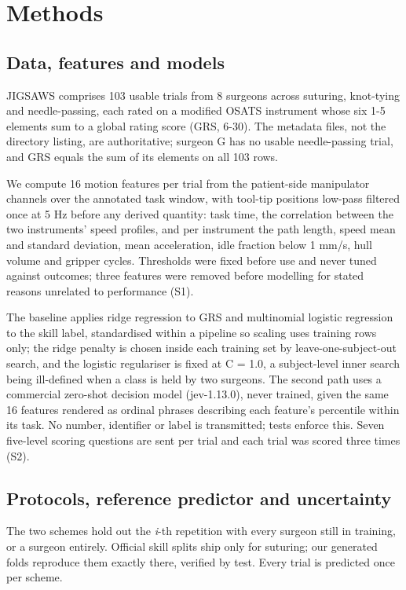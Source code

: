 \section{Methods}

\subsection{Data, features and models}

JIGSAWS comprises 103 usable trials from 8 surgeons across suturing, knot-tying and needle-passing, each rated on a modified OSATS instrument whose six 1-5 elements sum to a global rating score (GRS, 6-30). The metadata files, not the directory listing, are authoritative; surgeon G has no usable needle-passing trial, and GRS equals the sum of its elements on all 103 rows.

We compute 16 motion features per trial from the patient-side manipulator channels over the annotated task window, with tool-tip positions low-pass filtered once at 5 Hz before any derived quantity: task time, the correlation between the two instruments' speed profiles, and per instrument the path length, speed mean and standard deviation, mean acceleration, idle fraction below 1 mm/s, hull volume and gripper cycles. Thresholds were fixed before use and never tuned against outcomes; three features were removed before modelling for stated reasons unrelated to performance (S1).

The baseline applies ridge regression to GRS and multinomial logistic regression to the skill label, standardised within a pipeline so scaling uses training rows only; the ridge penalty is chosen inside each training set by leave-one-subject-out search, and the logistic regulariser is fixed at C = 1.0, a subject-level inner search being ill-defined when a class is held by two surgeons. The second path uses a commercial zero-shot decision model (jev-1.13.0), never trained, given the same 16 features rendered as ordinal phrases describing each feature's percentile within its task. No number, identifier or label is transmitted; tests enforce this. Seven five-level scoring questions are sent per trial and each trial was scored three times (S2).

\subsection{Protocols, reference predictor and uncertainty}

The two schemes hold out the \textit{i}-th repetition with every surgeon still in training, or a surgeon entirely. Official skill splits ship only for suturing; our generated folds reproduce them exactly there, verified by test. Every trial is predicted once per scheme.

